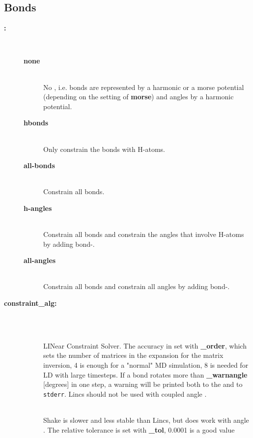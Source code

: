 \subsection{Bonds}
\begin{description}
\item[{\bf {}:}]\mbox{}\\
\vspace{-2ex}\begin{description}
\item[{\bf none}]\mbox{}\\
No , i.e. bonds are represented by a harmonic or a
morse potential (depending on the setting of {\bf morse}) and angles
by a harmonic potential.
\item[{\bf hbonds}]\mbox{}\\
Only constrain the bonds with H-atoms.
\item[{\bf all-bonds}]\mbox{}\\
Constrain all bonds.
\item[{\bf h-angles}]\mbox{}\\
Constrain all bonds and constrain the angles that involve H-atoms
by adding bond-.
\item[{\bf all-angles}]\mbox{}\\
Constrain all bonds and constrain all angles by adding bond-.
\end{description}
\item[{\bf constraint\_alg:}]\mbox{}\\
\vspace{-2ex}\begin{description}
\item[{\bf {}}]\mbox{}\\
LINear Constraint Solver. The accuracy in set with
{\bf {}\_order}, which sets the number of matrices in the expansion
for the matrix inversion, 4 is enough for a "normal" MD simulation, 8 is
needed for LD with large timesteps. If a bond rotates more than
{\bf {}\_warnangle} [degrees] in one step, 
a warning will be printed both to the  and to {\tt stderr}. 
Lincs should not be used with coupled angle .
\item[{\bf {}}]\mbox{}\\
Shake is slower and less stable than Lincs, but does work with 
angle . 
The relative tolerance is set with {\bf {}\_tol}, 0.0001 is a good value

\end{description}
\end{description}
